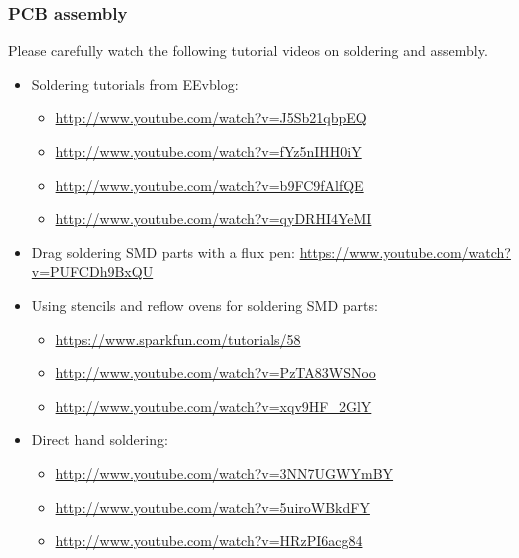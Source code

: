 \documentclass[letterpaper, 11pt]{article}
\begin{document}
\subsubsection{PCB assembly}
Please carefully watch the following tutorial videos on soldering and assembly. 
\begin{itemize}
	\item Soldering tutorials from EEvblog:
		\begin{itemize}
			\item \url{http://www.youtube.com/watch?v=J5Sb21qbpEQ}
			\item \url{http://www.youtube.com/watch?v=fYz5nIHH0iY}
			\item \url{http://www.youtube.com/watch?v=b9FC9fAlfQE}
			\item \url{http://www.youtube.com/watch?v=qyDRHI4YeMI}
		\end{itemize}
	\item Drag soldering SMD parts with a flux pen: \url{https://www.youtube.com/watch?v=PUFCDh9BxQU}
	
	\item Using stencils and reflow ovens for soldering SMD parts:
		\begin{itemize}
			\item \url{https://www.sparkfun.com/tutorials/58}
			\item \url{http://www.youtube.com/watch?v=PzTA83WSNoo}
			\item \url{http://www.youtube.com/watch?v=xqv9HF_2GlY } 
		\end{itemize}
	 \item Direct hand soldering:
		 \begin{itemize}
			 \item \url{http://www.youtube.com/watch?v=3NN7UGWYmBY}
			 \item \url{http://www.youtube.com/watch?v=5uiroWBkdFY}
			 \item \url{http://www.youtube.com/watch?v=HRzPI6acg84}
		 \end{itemize}
		 
\end{itemize}
\end{document}
